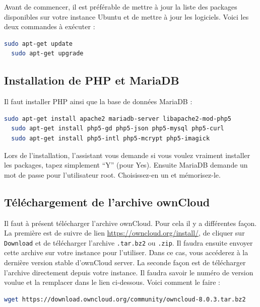 Avant de commencer, il est préférable de mettre à jour la liste des packages disponibles sur votre instance Ubuntu et de mettre à jour les logiciels. Voici les deux commandes à exécuter : \\

\begin{lstlisting}[language=bash]
  sudo apt-get update
  sudo apt-get upgrade
\end{lstlisting}

\subsection{Installation de PHP et MariaDB}

Il faut installer PHP ainsi que la base de données MariaDB : \\

\begin{lstlisting}[language=bash]
  sudo apt-get install apache2 mariadb-server libapache2-mod-php5
  sudo apt-get install php5-gd php5-json php5-mysql php5-curl
  sudo apt-get install php5-intl php5-mcrypt php5-imagick
\end{lstlisting}

Lors de l'installation, l'assistant vous demande si vous voulez vraiment installer les packages, tapez simplement ``Y'' (pour Yes). Ensuite MariaDB demande un mot de passe pour l'utilisateur root. Choisissez-en un et mémorisez-le.


\subsection{Téléchargement de l'archive ownCloud}

Il faut à présent télécharger l'archive ownCloud. Pour cela il y a différentes façon. La première est de suivre de lien \url{https://owncloud.org/install/}, de cliquer sur \texttt{Download} et de télécharger l'archive \texttt{.tar.bz2} ou \texttt{.zip}. Il faudra ensuite envoyer cette archive sur votre instance pour l'utiliser. Dans ce cas, vous accéderez à la dernière version stable d'ownCloud server. La seconde façon est de télécharger l'archive directement depuis votre instance. Il faudra savoir le numéro de version voulue et la remplacer dans le lien ci-dessous. Voici comment le faire : \\

\begin{lstlisting}[language=bash]
  wget https://download.owncloud.org/community/owncloud-8.0.3.tar.bz2
\end{lstlisting}

